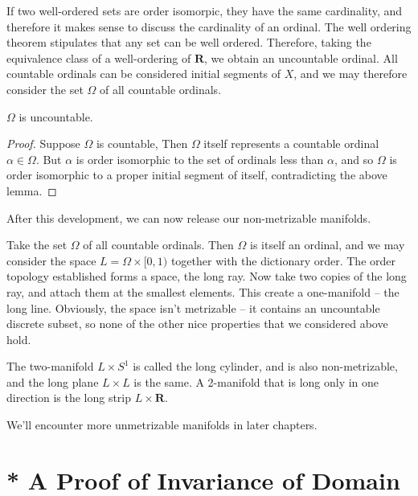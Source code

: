 If two well-ordered sets are order isomorpic, they have the same cardinality, and therefore it makes sense to discuss the cardinality of an ordinal. The well ordering theorem stipulates that any set can be well ordered. Therefore, taking the equivalence class of a well-ordering of $\mathbf{R}$, we obtain an uncountable ordinal. All countable ordinals can be considered initial segments of $X$, and we may therefore consider the set $\Omega$ of all countable ordinals.

\begin{theorem}
    $\Omega$ is uncountable.
\end{theorem}
\begin{proof}
    Suppose $\Omega$ is countable, Then $\Omega$ itself represents a countable ordinal $\alpha \in \Omega$. But $\alpha$ is order isomorphic to the set of ordinals less than $\alpha$, and so $\Omega$ is order isomorphic to a proper initial segment of itself, contradicting the above lemma.
\end{proof}

After this development, we can now release our non-metrizable manifolds.

\begin{example}
    Take the set $\Omega$ of all countable ordinals. Then $\Omega$ is itself an ordinal, and we may consider the space $L = \Omega \times [0,1)$ together with the dictionary order. The order topology established forms a space, the long ray. Now take two copies of the long ray, and attach them at the smallest elements. This create a one-manifold -- the long line. Obviously, the space isn't metrizable -- it contains an uncountable discrete subset, so none of the other nice properties that we considered above hold.
\end{example}

\begin{example}
    The two-manifold $L \times S^1$ is called the long cylinder, and is also non-metrizable, and the long plane $L \times L$ is the same. A 2-manifold that is long only in one direction is the long strip $L \times \mathbf{R}$.
\end{example}

We'll encounter more unmetrizable manifolds in later chapters.

\newpage

\section{* A Proof of Invariance of Domain}

